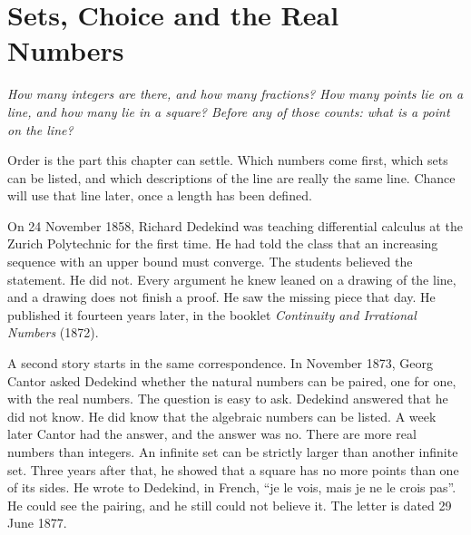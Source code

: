 \chapter{Sets, Choice and the Real Numbers}\label{ch:sets}

\begin{center}\itshape
How many integers are there, and how many fractions? How many points lie on a line, and how many lie in a square?
Before any of those counts: what is a point on the line?
\end{center}

Order is the part this chapter can settle. Which numbers come first, which sets can be listed, and which descriptions of the line are really the same line. Chance will use that line later, once a length has been defined.

On 24 November 1858, Richard Dedekind was teaching differential calculus at the Zurich Polytechnic for the first time. He had told the class that an increasing sequence with an upper bound must converge. The students believed the statement. He did not. Every argument he knew leaned on a drawing of the line, and a drawing does not finish a proof. He saw the missing piece that day. He published it fourteen years later, in the booklet \emph{Continuity and Irrational Numbers} (1872).


A second story starts in the same correspondence. In November 1873, Georg Cantor asked Dedekind whether the natural numbers can be paired, one for one, with the real numbers. The question is easy to ask. Dedekind answered that he did not know. He did know that the algebraic numbers can be listed. A week later Cantor had the answer, and the answer was no. There are more real numbers than integers. An infinite set can be strictly larger than another infinite set. Three years after that, he showed that a square has no more points than one of its sides. He wrote to Dedekind, in French, ``je le vois, mais je ne le crois pas''. He could see the pairing, and he still could not believe it. The letter is dated 29 June 1877.


